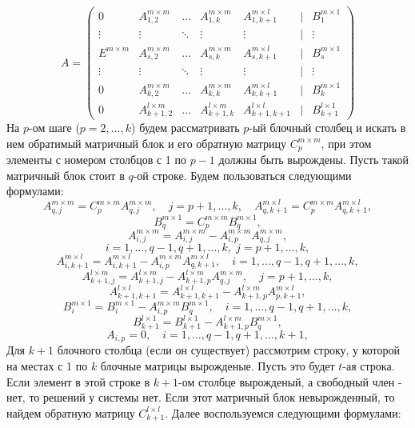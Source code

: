 \documentclass[a4paper,12pt]{article}
\begin{document}
$$
    A=
   \begin{pmatrix}
     0 & A^{m \times m}_{1,2} &\ldots & A^{m \times m}_{1,k} & A^{m \times l}_{1,k+1} & \mid & B^{m \times 1}_1\\
     \vdots& \vdots &\ddots & \vdots & \vdots & \mid  & \vdots\\
     E^{m \times m} & A^{m \times m}_{s,2} &\ldots & A^{m \times m}_{s,k} & A^{m \times l}_{s,k+1} & \mid & B^{m \times 1}_s\\
     \vdots& \vdots &\ddots & \vdots & \vdots & \mid  & \vdots\\
    0 & A^{m \times m}_{k,2} &\ldots & A^{m \times m}_{k,k} & A^{m \times l}_{k,k+1} & \mid & B^{m \times 1}_k\\
     0 & A^{l \times m}_{k+1,2} & \ldots & A^{l \times m}_{k+1,k} & A^{l \times l}_{k+1,k+1} & \mid & B^{l \times 1}_{k+1}
    \end{pmatrix}
$$
На $p$-ом шаге ($p=2,\dots,k$) будем рассматривать $p$-ый блочный столбец и искать в нем обратимый матричный блок и его обратную матрицу $C^{m \times m}_p$, при этом элементы с номером столбцов с 1 по $p-1$ должны быть вырождены. Пусть такой матричный блок стоит в $q$-ой строке. Будем пользоваться следующими формулами:
$$
    A^{m \times m}_{q,j} = C^{m \times m}_pA^{m \times m}_{q,j}, \quad j=p+1,\dots,k, \quad A^{m \times l}_{q, k+1} = C^{m \times m}_pA^{m \times l}_{q,k+1},
$$
$$
    B^{m \times 1}_q = C^{m \times m}_pB^{m \times 1}_q,
$$
$$
    A^{m \times m}_{i,j} = A^{m \times m}_{i,j} - A^{m \times m}_{i,p}A^{m \times m}_{q,j},
$$
$$
    i=1,\dots,q-1,q+1,\dots,k, \; j=p+1,\dots,k,
$$
$$
    A^{m \times l}_{i, k+1} = A^{m \times l}_{i, k+1} - A^{m \times m}_{i, p}A^{m \times l}_{q, k+1}, \quad i=1,\dots,q-1,q+1,\dots,k,
$$
$$
    A^{l \times m}_{k+1, j} = A^{l \times m}_{k+1, j} - A^{l \times m}_{k+1, p}A^{m \times m}_{q, j}, \quad j=p+1,\dots,k,
$$
$$
    A^{l \times l}_{k+1, k+1} = A^{l \times l}_{k+1, k+1} - A^{l \times m}_{k+1, p}A^{m \times l}_{p, k+1},
$$
$$
    B^{m \times 1}_i = B^{m \times 1}_i - A^{m \times m}_{i,p}B^{m \times 1}_q, \quad i=1,\dots,q-1,q+1,\dots,k,
$$
$$
    B^{l \times 1}_{k+1} = B^{l \times 1}_{k+1} - A^{l \times m}_{k+1, p}B^{m \times 1}_q,
$$
$$
    A_{i,p}=0, \quad i=1,\dots,q-1,q+1,\dots,k+1,
$$
Для $k+1$ блочного столбца (если он существует) рассмотрим строку, у которой на местах с 1 по $k$ блочные матрицы вырожденые. Пусть это будет $t$-ая строка. Если элемент в этой строке в $k+1$-ом столбце вырожденый, а свободный член - нет, то решений у системы нет. Если этот матричный блок невырожденный, то найдем обратную матрицу $C^{l \times l}_{k+1}$. Далее воспользуемся следующими формулами:
\end{document}
